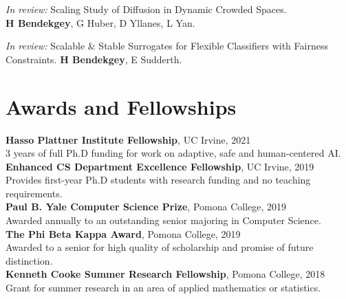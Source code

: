 \documentclass[margin]{res}
\begin{document}
\begin{resume}
\emph{In review:} Scaling Study of Diffusion in Dynamic Crowded Spaces. \\\textbf{H Bendekgey}, G Huber, D Yllanes, L Yan.

\emph{In review:} Scalable \& Stable Surrogates for Flexible Classifiers with Fairness \\Constraints. \textbf{H Bendekgey}, E Sudderth.


\section{Awards and Fellowships}
\textbf{Hasso Plattner Institute Fellowship}, UC Irvine, 2021\\
3 years of full Ph.D funding for work on adaptive, safe and human-centered AI.\\
\textbf{Enhanced CS Department Excellence Fellowship}, UC Irvine, 2019\\ Provides first-year Ph.D students with research funding and no teaching requirements.\\
\textbf{Paul B. Yale Computer Science Prize}, Pomona College, 2019\\Awarded annually to an outstanding senior majoring in Computer Science.\\
\textbf{The Phi Beta Kappa Award}, Pomona College, 2019\\Awarded to a senior for high quality of scholarship and promise of future distinction.\\
\textbf{Kenneth Cooke Summer Research Fellowship}, Pomona College, 2018\\Grant for summer research in an area of applied mathematics or statistics.\\

\end{resume}
\end{document}
